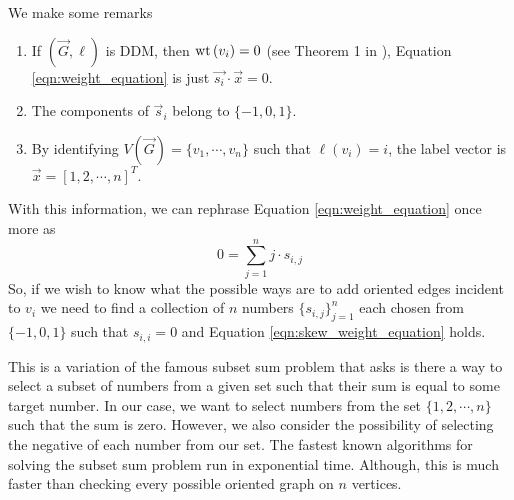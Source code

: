 We make some remarks
\begin{enumerate}
\item If \((\vec{G}, \ell)\) is DDM, then \(\mathrm{wt}\,(v_i) = 0\) (see Theorem 1 in \cite{altmanDifferenceDistanceMagic2024}),
Equation \ref{eqn:weight_equation} is just \(\vec{s_i} \cdot \vec{x} = 0\).

\item The components of \(\vec{s}_i\) belong to \(\{-1, 0, 1\}\).

\item By identifying \(V(\vec{G}) = \{v_1, \cdots, v_n\}\) such that \(\ell(v_i) = i\), the label vector
is \(\vec{x} = [1, 2, \cdots, n]^T\).
\end{enumerate}

With this information, we can rephrase Equation \ref{eqn:weight_equation} once more as
\begin{equation}
    \label{eqn:skew_weight_equation}
0 = \sum_{j=1}^n j \cdot s_{i, j}
\end{equation}
So, if we wish to know what the possible ways are to add oriented edges incident to \(v_i\)
we need to find a collection of \(n\) numbers \(\{s_{i,j}\}_{j=1}^n\) each chosen from
\(\{-1, 0, 1\}\) such that \(s_{i, i} = 0\) and Equation \ref{eqn:skew_weight_equation} holds.

This is a variation of the famous subset sum problem that asks is there a way to
select a subset of numbers from a given set such that their sum is equal to some target number.
In our case, we want to select numbers from the set \(\{1, 2, \cdots, n\}\)
such that the sum is zero. However, we also consider the possibility of selecting the negative of each number from our set.
The fastest known algorithms for solving the subset sum problem run in exponential time.
Although, this is much faster than checking every possible oriented graph on \(n\) vertices.


